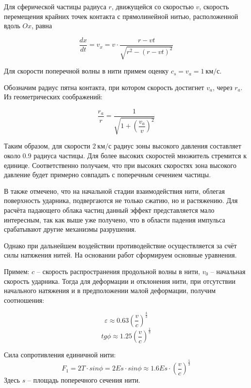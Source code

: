 Для сферической частицы радиуса $r$, движущейся со скоростью $v$, скорость перемещения крайних точек контакта с
прямолинейной нитью, расположенной вдоль $Ox$, равна

\begin{equation}
    \frac{dx}{dt} = v_x = v \cdot \frac{r - v t}{\sqrt{r^2 - (r - v t)^2}}
\end{equation}

Для скорости поперечной волны в нити примем оценку $c_s = v_a = 1~км/с$.

Обозначим радиус пятна контакта, при котором скорость достигнет $v_a$, через $r_a$.
Из геометрических соображений:

\begin{equation}
    \dfrac{r_a}{r} = \dfrac{1}{\sqrt{1 + (\dfrac{v_a}{v})^2}}
\end{equation}

Таким образом, для скорости $2~км/с$ радиус зоны высокого давления составляет около $0.9$ радиуса частицы.
Для более высоких скоростей множитель стремится к единице.
Соответственно получаем, что при высоких скоростях зона высокого давление будет примерно совпадать с поперечным сечением частицы.

В\cite{kobylkin2014} также отмечено, что на начальной стадии взаимодействия нити, облегая поверхность ударника, подвергаются
не только сжатию, но и растяжению.
Для расчёта падающего облака частиц данный эффект представляется мало интересным, так как выше уже получено, что в области
падения импульса срабатывают другие механизмы разрушения.

Однако при дальнейшем воздействии противодействие осуществляется за счёт силы натяжения нитей.
На основании работ\cite{rakhmatulin} сформируем основные уравнения.

Примем: $c$ -- скорость распространения продольной волны в нити, $v_0$ -- начальная скорость ударника.
Тогда для деформации и отклонения нити, при отсутствии начального натяжения и в предположении малой деформации,
получим соотношения:

\begin{equation}
    \varepsilon \approx 0.63 \left( \dfrac{v}{c} \right)^{\frac{4}{3}}
\end{equation}
\begin{equation}
    tg \phi \approx 1.25 \left( \dfrac{v}{c} \right)^{\frac{1}{3}}
\end{equation}

Сила сопротивления единичной нити:
\begin{equation}
    F_1 = 2 T \cdot sin \phi = 2 E s \cdot sin \phi \approx 1.6 E s \cdot \left( \dfrac{v}{c} \right)^{\frac{5}{3}}
\end{equation}
Здесь $s$ -- площадь поперечного сечения нити.

